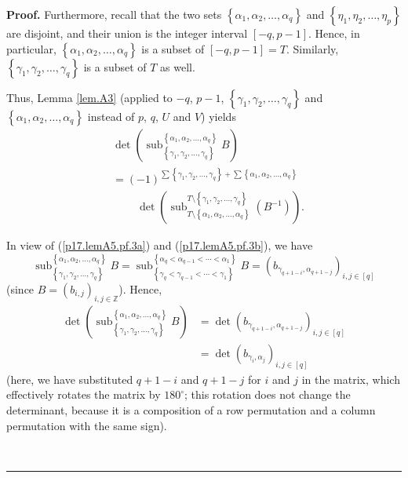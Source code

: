 \documentclass[numbers=enddot,12pt,final,onecolumn,notitlepage]{scrartcl}%
\theoremstyle{definition}
\newenvironment{proof}[1][Proof]{\noindent\textbf{#1.} }{\ \rule{0.5em}{0.5em}}
\let\sumnonlimits\sum
\renewcommand{\sum}{\sumnonlimits\limits}
\begin{document}
\begin{enumerate}
\begin{proof}
Furthermore, recall that the two sets $\left\{  \alpha_{1},\alpha_{2}%
,\ldots,\alpha_{q}\right\}  $ and $\left\{  \eta_{1},\eta_{2},\ldots,\eta
_{p}\right\}  $ are disjoint, and their union is the integer interval $\left[
-q,p-1\right]  $. Hence, in particular, $\left\{  \alpha_{1},\alpha_{2}%
,\ldots,\alpha_{q}\right\}  $ is a subset of $\left[  -q,p-1\right]  =T$.
Similarly, $\left\{  \gamma_{1},\gamma_{2},\ldots,\gamma_{q}\right\}  $ is a
subset of $T$ as well.

Thus, Lemma \ref{lem.A3} (applied to $-q$, $p-1$, $\left\{  \gamma_{1}%
,\gamma_{2},\ldots,\gamma_{q}\right\}  $ and $\left\{  \alpha_{1},\alpha
_{2},\ldots,\alpha_{q}\right\}  $ instead of $p$, $q$, $U$ and $V$) yields%
\begin{align}
&  \det\left(  \operatorname*{sub}\nolimits_{\left\{  \gamma_{1},\gamma
_{2},\ldots,\gamma_{q}\right\}  }^{\left\{  \alpha_{1},\alpha_{2}%
,\ldots,\alpha_{q}\right\}  }B\right) \nonumber\\
&  =\left(  -1\right)  ^{\sum\left\{  \gamma_{1},\gamma_{2},\ldots,\gamma
_{q}\right\}  +\sum\left\{  \alpha_{1},\alpha_{2},\ldots,\alpha_{q}\right\}
}\nonumber\\
&  \ \ \ \ \ \ \ \ \ \ \det\left(  \operatorname*{sub}\nolimits_{T\setminus
\left\{  \alpha_{1},\alpha_{2},\ldots,\alpha_{q}\right\}  }^{T\setminus
\left\{  \gamma_{1},\gamma_{2},\ldots,\gamma_{q}\right\}  }\left(
B^{-1}\right)  \right)  . \label{p17.lemA5.pf.4}%
\end{align}


In view of (\ref{p17.lemA5.pf.3a}) and (\ref{p17.lemA5.pf.3b}), we have%
\[
\operatorname*{sub}\nolimits_{\left\{  \gamma_{1},\gamma_{2},\ldots,\gamma
_{q}\right\}  }^{\left\{  \alpha_{1},\alpha_{2},\ldots,\alpha_{q}\right\}
}B=\operatorname*{sub}\nolimits_{\left\{  \gamma_{q}<\gamma_{q-1}%
<\cdots<\gamma_{1}\right\}  }^{\left\{  \alpha_{q}<\alpha_{q-1}<\cdots
<\alpha_{1}\right\}  }B=\left(  b_{\gamma_{q+1-i},\alpha_{q+1-j}}\right)
_{i,j\in\left[  q\right]  }%
\]
(since $B=\left(  b_{i,j}\right)  _{i,j\in\mathbb{Z}}$). Hence,%
\begin{align}
\det\left(  \operatorname*{sub}\nolimits_{\left\{  \gamma_{1},\gamma
_{2},\ldots,\gamma_{q}\right\}  }^{\left\{  \alpha_{1},\alpha_{2}%
,\ldots,\alpha_{q}\right\}  }B\right)   &  =\det\left(  b_{\gamma
_{q+1-i},\alpha_{q+1-j}}\right)  _{i,j\in\left[  q\right]  }\nonumber\\
&  =\det\left(  b_{\gamma_{i},\alpha_{j}}\right)  _{i,j\in\left[  q\right]  }
\label{p17.lemA5.pf.5}%
\end{align}
(here, we have substituted $q+1-i$ and $q+1-j$ for $i$ and $j$ in the matrix,
which effectively rotates the matrix by $180^{\circ}$; this rotation does not
change the determinant, because it is a composition of a row permutation and a
column permutation with the same sign).


\end{proof}
\end{enumerate}
\end{document}
